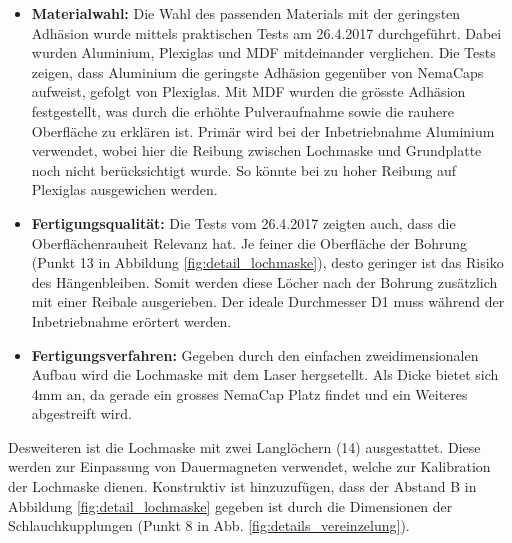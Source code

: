 \begin{itemize}
	\item \textbf{Materialwahl:} Die Wahl des passenden Materials mit der geringsten Adhäsion wurde mittels praktischen Tests am 26.4.2017 durchgeführt. Dabei wurden Aluminium, Plexiglas und MDF mitdeinander verglichen. Die Tests zeigen, dass Aluminium die geringste Adhäsion gegenüber von NemaCaps aufweist, gefolgt von Plexiglas. Mit MDF wurden die grösste Adhäsion festgestellt, was durch die erhöhte Pulveraufnahme sowie die rauhere Oberfläche zu erklären ist. Primär wird bei der Inbetriebnahme Aluminium verwendet, wobei hier die Reibung zwischen Lochmaske und Grundplatte noch nicht berücksichtigt wurde. So könnte bei zu hoher Reibung auf Plexiglas ausgewichen werden.
	
	\item \textbf{Fertigungsqualität:} Die Tests vom 26.4.2017 zeigten auch, dass die Oberflächenrauheit Relevanz hat. Je feiner die Oberfläche der Bohrung (Punkt 13 in Abbildung \ref{fig:detail_lochmaske}), desto geringer ist das Risiko des Hängenbleiben. Somit werden diese Löcher nach der Bohrung zusätzlich mit einer Reibale ausgerieben. Der ideale Durchmesser D1 muss während der Inbetriebnahme erörtert werden.
	
	\item \textbf{Fertigungsverfahren:} Gegeben durch den einfachen zweidimensionalen Aufbau wird die Lochmaske mit dem Laser hergsetellt. Als Dicke bietet sich 4mm an, da gerade ein grosses NemaCap Platz findet und ein Weiteres abgestreift wird.
\end{itemize}
Desweiteren ist die Lochmaske mit zwei Langlöchern (14) ausgestattet. Diese werden zur Einpassung von Dauermagneten verwendet, welche zur Kalibration der Lochmaske dienen. Konstruktiv ist hinzuzufügen, dass der Abstand B in Abbildung \ref{fig:detail_lochmaske} gegeben ist durch die Dimensionen der Schlauchkupplungen (Punkt 8 in Abb. \ref{fig:details_vereinzelung}).
